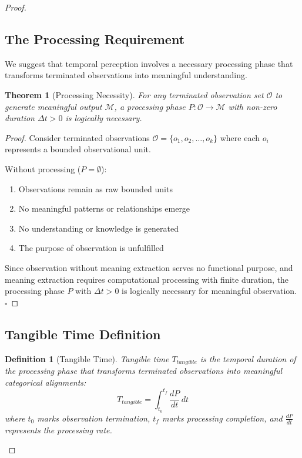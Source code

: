 \documentclass[12pt,a4paper]{article}
\newtheorem{theorem}{Theorem}
\newtheorem{definition}{Definition}
\begin{document}
\begin{proof}
\subsection{The Processing Requirement}

We suggest that temporal perception involves a necessary processing phase that transforms terminated observations into meaningful understanding.

\begin{theorem}[Processing Necessity]
For any terminated observation set $\mathcal{O}$ to generate meaningful output $\mathcal{M}$, a processing phase $P: \mathcal{O} \rightarrow \mathcal{M}$ with non-zero duration $\Delta t > 0$ is logically necessary.
\end{theorem}

\begin{proof}
Consider terminated observations $\mathcal{O} = \{o_1, o_2, \ldots, o_k\}$ where each $o_i$ represents a bounded observational unit.

Without processing ($P = \emptyset$):
\begin{enumerate}
\item Observations remain as raw bounded units
\item No meaningful patterns or relationships emerge
\item No understanding or knowledge is generated
\item The purpose of observation is unfulfilled
\end{enumerate}

Since observation without meaning extraction serves no functional purpose, and meaning extraction requires computational processing with finite duration, the processing phase $P$ with $\Delta t > 0$ is logically necessary for meaningful observation. $\square$
\end{proof}

\subsection{Tangible Time Definition}

\begin{definition}[Tangible Time]
Tangible time $T_{tangible}$ is the temporal duration of the processing phase that transforms terminated observations into meaningful categorical alignments:
$$T_{tangible} = \int_{t_0}^{t_f} \frac{dP}{dt} \, dt$$
where $t_0$ marks observation termination, $t_f$ marks processing completion, and $\frac{dP}{dt}$ represents the processing rate.
\end{definition}


\end{proof}
\end{document}
